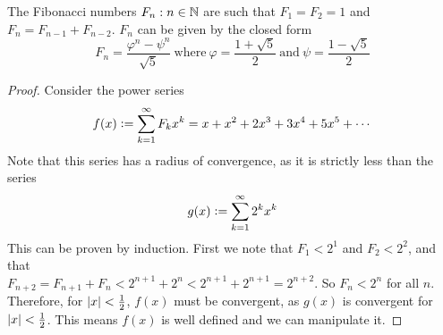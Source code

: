 \begin{theorem}
The Fibonacci numbers \(F_n: n \in \mathbb N\) are such that
\(F_1 = F_2 = 1\) and \(F_n = F_{n - 1} + F_{n - 2}\).  \(F_n\) can be given
by the closed form
\begin{equation*}
F_n = \frac{\varphi^n - \psi^n}{\sqrt 5}
\ \text{where}\ \varphi = \frac{1 + \sqrt 5} 2
\ \text{and}\ \psi = \frac{1 - \sqrt 5} 2
\end{equation*}
\end{theorem}
\begin{proof}
Consider the power series
\begin{equation*}
f(x) \vcentcolon= \sum_{k=1}^\infty F_k x^k = x + x^2 + 2x^3 + 3x^4 + 5x^5
    + \dotsb
\end{equation*}
Note that this series has a radius of convergence, as it is strictly less
than the series
\begin{equation*}
g(x) \vcentcolon= \sum_{k=1}^\infty 2^k x^k
\end{equation*}
This can be proven by induction. First we note that \(F_1 < 2^1\) and
\(F_2 < 2^2\), and that \\
\(F_{n + 2} = F_{n + 1} + F_n < 2^{n + 1} + 2^n < 2^{n + 1} + 2^{n + 1}
    = 2^{n + 2}\). So \(F_n < 2^n\) for all \(n\). Therefore, for
\(\abs{x} < \frac 12\), \(f(x)\)  must be convergent, as \(g(x)\) is
convergent for \(\abs{x} < \frac 12\). This means \(f(x)\) is well defined
and we can manipulate it.


\end{proof}

